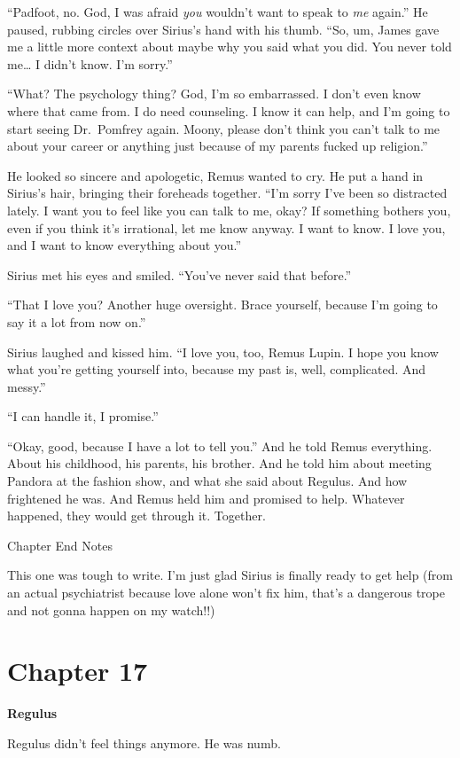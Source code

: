 \documentclass[12pt,twoside,openright]{memoir}
\begin{document}
``Padfoot, no. God, I was afraid \textit{you} wouldn't want to speak to \textit{me} again.'' He paused, rubbing circles over Sirius's hand with his thumb. ``So, um, James gave me a little more context about maybe why you said what you did. You never told me… I didn't know. I'm sorry.''

``What? The psychology thing? God, I'm so embarrassed. I don't even know where that came from. I do need counseling. I know it can help, and I'm going to start seeing Dr.\ Pomfrey again. Moony, please don't think you can't talk to me about your career or anything just because of my parents fucked up religion.'' 

He looked so sincere and apologetic, Remus wanted to cry. He put a hand in Sirius's hair, bringing their foreheads together. ``I'm sorry I've been so distracted lately. I want you to feel like you can talk to me, okay? If something bothers you, even if you think it's irrational, let me know anyway. I want to know. I love you, and I want to know everything about you.''

Sirius met his eyes and smiled. ``You've never said that before.''

``That I love you? Another huge oversight. Brace yourself, because I'm going to say it a lot from now on.'' 

Sirius laughed and kissed him. ``I love you, too, Remus Lupin. I hope you know what you're getting yourself into, because my past is, well, complicated. And messy.'' 

``I can handle it, I promise.''

``Okay, good, because I have a lot to tell you.'' And he told Remus everything. About his childhood, his parents, his brother. And he told him about meeting Pandora at the fashion show, and what she said about Regulus. And how frightened he was. And Remus held him and promised to help. Whatever happened, they would get through it. Together.

Chapter End Notes

This one was tough to write. I'm just glad Sirius is finally ready to get help (from an actual psychiatrist because love alone won't fix him, that's a dangerous trope and not gonna happen on my watch!!)
\chapter*{Chapter 17}

\textbf{Regulus} 

Regulus didn't feel things anymore. He was numb.
\end{document}

